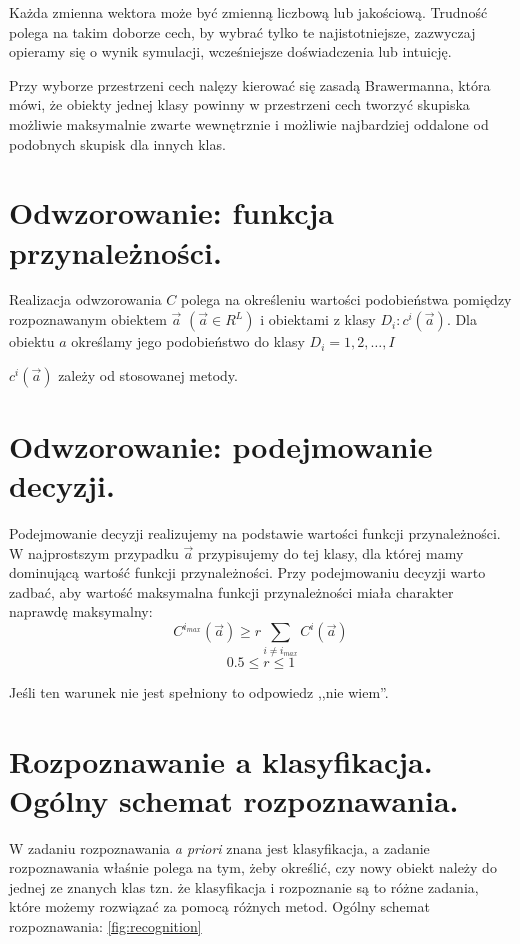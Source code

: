 \documentclass[a4paper,10pt]{article}
\begin{document}
Każda zmienna wektora może być zmienną liczbową lub jakościową. Trudność polega na takim doborze cech, by wybrać tylko te najistotniejsze, zazwyczaj opieramy się o wynik symulacji, wcześniejsze doświadczenia lub intuicję.

Przy wyborze przestrzeni cech nalęzy kierować się zasadą Brawermanna, która mówi, że obiekty jednej klasy powinny w przestrzeni cech tworzyć skupiska możliwie maksymalnie zwarte wewnętrznie i możliwie najbardziej oddalone od podobnych skupisk dla innych klas.

\section{Odwzorowanie: funkcja przynależności.}
Realizacja odwzorowania $C$ polega na określeniu wartości podobieństwa pomiędzy rozpoznawanym obiektem $\overrightarrow{a}$ $(\overrightarrow{a} \in R^L)$ i obiektami z klasy $D_i: c^i(\overrightarrow{a})$. Dla obiektu $a$ określamy jego podobieństwo do klasy $D_i = 1, 2, \ldots, I$

$c^i(\overrightarrow{a})$ zależy od stosowanej metody.

\section{Odwzorowanie: podejmowanie decyzji.}
Podejmowanie decyzji realizujemy na podstawie wartości funkcji przynależności. W najprostszym przypadku $\overrightarrow{a}$ przypisujemy do tej klasy, dla której mamy dominującą wartość funkcji przynależności. Przy podejmowaniu decyzji warto zadbać, aby wartość maksymalna funkcji przynależności miała charakter naprawdę maksymalny:
\begin{equation}
C^{i_{max}}(\overrightarrow{a}) \geq r \sum_{i \neq i_{max}} C^i(\overrightarrow{a})
\end{equation}
\begin{equation}
 0.5 \leq r \leq 1
\end{equation}

Jeśli ten warunek nie jest spełniony to odpowiedz ,,nie wiem''.

\section{Rozpoznawanie a klasyfikacja. Ogólny schemat rozpoznawania.}
W zadaniu rozpoznawania \textit{a priori} znana jest klasyfikacja, a zadanie rozpoznawania właśnie polega na tym, żeby określić, czy nowy obiekt należy do jednej ze znanych klas tzn. że klasyfikacja i rozpoznanie są to różne zadania, które możemy rozwiązać za pomocą różnych metod.
Ogólny schemat rozpoznawania: \ref{fig:recognition}
\end{document}
